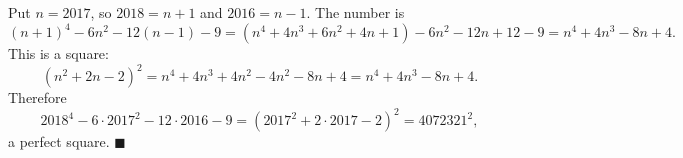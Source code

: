 Put $n=2017$, so $2018=n+1$ and $2016=n-1$. The number is
\[
(n+1)^4-6n^2-12(n-1)-9=\left(n^4+4n^3+6n^2+4n+1\right)-6n^2-12n+12-9=n^4+4n^3-8n+4 .
\]
This is a square:
\[
\left(n^2+2n-2\right)^2=n^4+4n^3+4n^2-4n^2-8n+4=n^4+4n^3-8n+4 .
\]
Therefore
\[
2018^4-6\cdot2017^2-12\cdot2016-9=\left(2017^2+2\cdot2017-2\right)^2=4072321^2,
\]
a perfect square. $\blacksquare$

